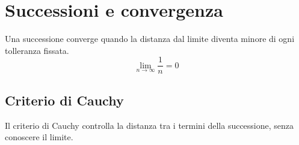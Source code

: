 \section{Successioni e convergenza}
\label{sec:successioni}
Una successione converge quando la distanza dal limite diventa minore di ogni tolleranza fissata.
\begin{equation}
  \lim_{n\to\infty} \frac{1}{n} = 0
  \label{eq:limite}
\end{equation}

\subsection{Criterio di Cauchy}
\label{sec:cauchy}
Il criterio di Cauchy controlla la distanza tra i termini della successione, senza conoscere il limite.
